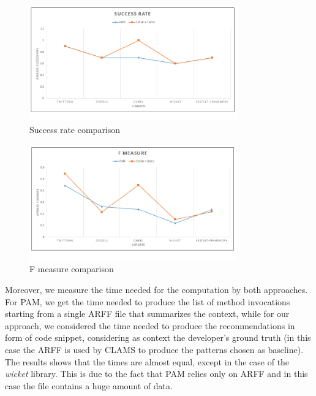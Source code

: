 \begin{figure}[!h]
\includegraphics[width=0.80\textwidth]{images/SuccRate.png}
\centering
\caption{Success rate comparison}
\label{fig:cmd}
\end{figure}


\begin{figure}[!h]
\includegraphics[width=0.80\textwidth]{images/Fmeasure.png}
\centering
\caption{F measure  comparison}
\label{fig:cmd}
\end{figure}


Moreover, we measure the time needed for the computation by both approaches. For PAM, we get the time needed to produce the list of method invocations starting from a single ARFF file that summarizes the context, while for our approach, we considered the time needed to produce the recommendations in form of code snippet, considering as context the developer's ground truth (in this case the ARFF is used by CLAMS to produce the patterns chosen as baseline). The results shows that the times are almost equal, except in the case of the \emph{wicket} library. This is due to the fact that PAM relies only on ARFF and in this case the file contains a huge amount of data. %

